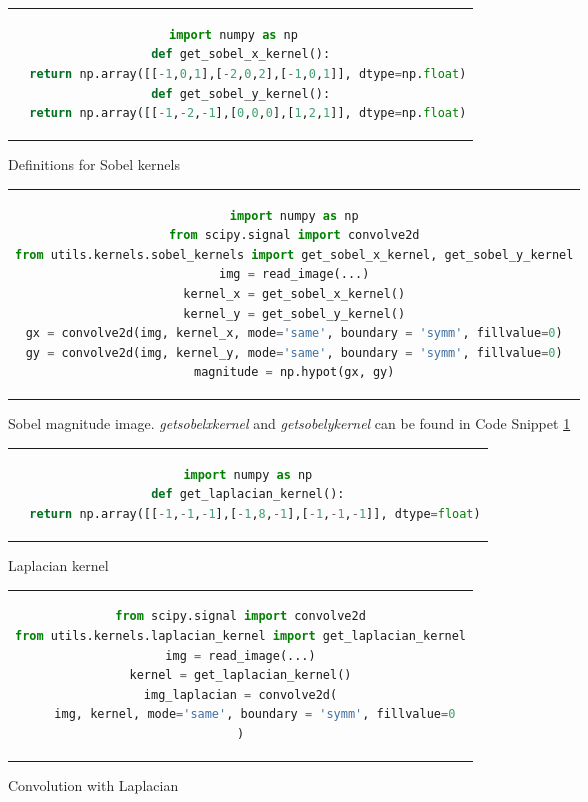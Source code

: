 \begin{figure}[htpb]
	\begin{tabular}{c}
	\begin{lstlisting}[language=Python]
import numpy as np	
def get_sobel_x_kernel():
  return np.array([[-1,0,1],[-2,0,2],[-1,0,1]], dtype=np.float)
def get_sobel_y_kernel():
  return np.array([[-1,-2,-1],[0,0,0],[1,2,1]], dtype=np.float)
	\end{lstlisting}
	\end{tabular}
	\caption[Example listing]{Definitions for Sobel kernels}
\label{code:sobel-kernels}
\end{figure}

\begin{figure}[htpb]
	\begin{tabular}{c}
	\begin{lstlisting}[language=Python]
import numpy as np
from scipy.signal import convolve2d
from utils.kernels.sobel_kernels import get_sobel_x_kernel, get_sobel_y_kernel
img = read_image(...)
kernel_x = get_sobel_x_kernel()
kernel_y = get_sobel_y_kernel()
gx = convolve2d(img, kernel_x, mode='same', boundary = 'symm', fillvalue=0)
gy = convolve2d(img, kernel_y, mode='same', boundary = 'symm', fillvalue=0)
magnitude = np.hypot(gx, gy)
	\end{lstlisting}
	\end{tabular}
	\caption[Example listing]{Sobel magnitude image. \emph{get\textunderscore sobel\textunderscore x\textunderscore kernel} and \emph{get\textunderscore sobel\textunderscore y\textunderscore kernel} can be found in Code Snippet \ref{code:sobel-kernels}}
\label{code:sobel-magnitude}
\end{figure}

\begin{figure}[htpb]
	\begin{tabular}{c}
	\begin{lstlisting}[language=Python]
import numpy as np
def get_laplacian_kernel():
  return np.array([[-1,-1,-1],[-1,8,-1],[-1,-1,-1]], dtype=float)
	\end{lstlisting}
	\end{tabular}
	\caption[Example listing]{Laplacian kernel}
\label{code:laplacian-kernel}
\end{figure}

\begin{figure}[htpb]
	\begin{tabular}{c}
	\begin{lstlisting}[language=Python]
from scipy.signal import convolve2d
from utils.kernels.laplacian_kernel import get_laplacian_kernel
img = read_image(...)
kernel = get_laplacian_kernel()
img_laplacian = convolve2d(
	img, kernel, mode='same', boundary = 'symm', fillvalue=0
)
	\end{lstlisting}
	\end{tabular}
	\caption[Example listing]{Convolution with Laplacian}
\label{code:laplacian-filtered}
\end{figure}

